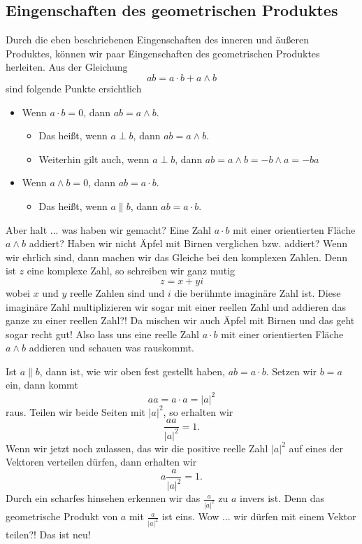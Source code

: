 \documentclass[fleqn]{scrartcl}
\numberwithin{equation}{section}
\begin{document}
\subsection{Eingenschaften des geometrischen Produktes}
Durch die eben beschriebenen Eingenschaften des inneren und äußeren Produktes,
können wir paar Eingenschaften des geometrischen Produktes herleiten. Aus der
Gleichung
\[ab = a\cdot b + a\wedge b\]
sind folgende Punkte ersichtlich
\begin{itemize}
\item Wenn $a \cdot b = 0$, dann $ab = a \wedge b$.
  \begin{itemize}
  \item Das heißt, wenn $a \perp b$, dann $ab = a\wedge b$.
  \item Weiterhin gilt auch, wenn $a \perp b$, dann $ab = a \wedge b = - b
      \wedge a = -ba$
  \end{itemize}
\item Wenn $a\wedge b = 0$, dann $ab = a \cdot b$.
  \begin{itemize}
  \item Das heißt, wenn $a \parallel b$, dann $ab = a \cdot b$.
  \end{itemize}
\end{itemize}

Aber halt ... was haben wir gemacht? Eine Zahl $a\cdot b$ mit einer orientierten
Fläche $a\wedge b$ addiert? Haben wir nicht Äpfel mit Birnen verglichen bzw.
addiert? Wenn wir ehrlich sind, dann machen wir das Gleiche bei den komplexen
Zahlen. Denn ist $z$ eine komplexe Zahl, so schreiben wir ganz mutig
\[z=x+yi\]
wobei $x$ und $y$ reelle Zahlen sind und $i$ die berühmte imaginäre Zahl ist.
Diese imaginäre Zahl multiplizieren wir sogar mit einer reellen Zahl und
addieren das ganze zu einer reellen Zahl?! Da mischen wir auch Äpfel mit
Birnen und das geht sogar recht gut! Also lass uns eine reelle Zahl $a\cdot b$
mit einer orientierten Fläche $a\wedge b$ addieren und schauen was rauskommt.

Ist $a \parallel b$, dann ist, wie wir oben fest gestellt haben, $ab = a
\cdot b$. Setzen wir $b=a$ ein, dann kommt
\[aa=a\cdot a = |a|^2\]
raus. Teilen wir beide Seiten mit $|a|^2$, so erhalten wir
\[\frac{aa}{|a|^2}=1.\]
Wenn wir jetzt noch zulassen, das wir die positive reelle Zahl $|a|^2$ auf
eines der Vektoren verteilen dürfen, dann erhalten wir
\[a\frac{a}{|a|^2}=1.\]
Durch ein scharfes hinsehen erkennen wir das $\frac{a}{|a|^2}$ zu $a$ invers
ist. Denn das geometrische Produkt von $a$ mit $\frac{a}{|a|^2}$ ist eins. Wow
... wir dürfen mit einem Vektor teilen?! Das ist neu!
\end{document}
